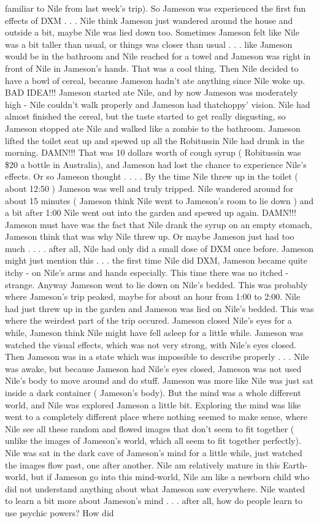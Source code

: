 \documentclass[12pt]{book}
\begin{document}
familiar to Nile from last week's trip). So Jameson was experienced the first fun effects of DXM . . .  Nile think Jameson just wandered around the house and outside a bit, maybe Nile was lied down too. Sometimes Jameson felt like Nile was a bit taller than usual, or things was closer than usual . . .  like Jameson would be in the bathroom and Nile reached for a towel and Jameson was right in front of Nile in Jameson's hands. That was a cool thing. Then Nile decided to have a bowl of cereal, because Jameson hadn't ate anything since Nile woke up. BAD IDEA!!! Jameson started ate Nile, and by now Jameson was moderately high - Nile couldn't walk properly and Jameson had thatchoppy' vision. Nile had almost finished the cereal, but the taste started to get really disgusting, so Jameson stopped ate Nile and walked like a zombie to the bathroom. Jameson lifted the toilet seat up and spewed up all the Robitussin Nile had drunk in the morning. DAMN!!! That was 10 dollars worth of cough syrup ( Robitussin was \$20 a bottle in Australia), and Jameson had lost the chance to experience Nile's effects. Or so Jameson thought . . .  . By the time Nile threw up in the toilet ( about 12:50 ) Jameson was well and truly tripped. Nile wandered around for about 15 minutes ( Jameson think Nile went to Jameson's room to lie down ) and a bit after 1:00 Nile went out into the garden and spewed up again. DAMN!!! Jameson must have was the fact that Nile drank the syrup on an empty stomach, Jameson think that was why Nile threw up. Or maybe Jameson just had too much . . .  . after all, Nile had only did a small dose of DXM once before. Jameson might just mention this . . .  the first time Nile did DXM, Jameson became quite itchy - on Nile's arms and hands especially. This time there was no itched - strange. Anyway Jameson went to lie down on Nile's bedded. This was probably where Jameson's trip peaked, maybe for about an hour from 1:00 to 2:00. Nile had just threw up in the garden and Jameson was lied on Nile's bedded. This was where the weirdest part of the trip occured. Jameson closed Nile's eyes for a while, Jameson think Nile might have fell asleep for a little while. Jameson was watched the visual effects, which was not very strong, with Nile's eyes closed. Then Jameson was in a state which was impossible to describe properly . . .  Nile was awake, but because Jameson had Nile's eyes closed, Jameson was not used Nile's body to move around and do stuff. Jameson was more like Nile was just sat inside a dark container ( Jameson's body). But the mind was a whole different world, and Nile was explored Jameson a little bit. Exploring the mind was like went to a completely different place where nothing seemed to make sense, where Nile see all these random and flowed images that don't seem to fit together ( unlike the images of Jameson's world, which all seem to fit together perfectly). Nile was sat in the dark cave of Jameson's mind for a little while, just watched the images flow past, one after another. Nile am relatively mature in this Earth-world, but if Jameson go into this mind-world, Nile am like a newborn child who did not understand anything about what Jameson saw everywhere. Nile wanted to learn a bit more about Jameson's mind . . .  after all, how do people learn to use psychic powers? How did 
\end{document}
